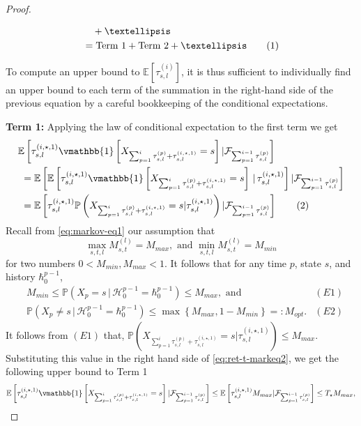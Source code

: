 \documentclass[opre,sglanonrev]{informs4}
\numberwithin{equation}{section}
\newcommand{\pow}[1]{^{(#1)}}
\newcommand{\lp}{\left(}
\newcommand{\rp}{\right)}
\newcommand{\lc}{\left\{}
\newcommand{\rc}{\right\}}
\newcommand{\lb}{\left[}
\newcommand{\rb}{\right]}
\newcommand{\History}{\mathcal{H}}
\newcommand{\history}{\hbar}
\newcommand{\Pbb}{\mathbb{P}}
\newcommand{\Fcal}{\mathcal{F}}
\newcommand\numberthis{\addtocounter{equation}{1}\tag{\theequation}}
\newcommand{\prob}{\Pbb}
\newcommand{\expec}{\mathbb{E}}
\newcommand{\indicator}{\vmathbb{1}}
\newcommand{\gn}{\, | \,}
\begin{document}
\begin{APPENDICES}
\begin{proof}
\begin{small}
\begin{align*}
    & \quad + \dots\\
    & = \text{Term 1}+\text{Term 2}+\dots\numberthis\label{eq:ret-t-markeq4}
\end{align*}
\end{small}
To compute an upper bound to $\expec[\tau_{s,l}\pow{i}]$, it is thus sufficient to individually find an upper bound to each term of the summation in the right-hand side of the previous equation by a careful bookkeeping of the conditional expectations.

\noindent\textbf{Term 1: }Applying the law of conditional expectation to the first term we get
\begin{align*}
    & \expec\lb\tau_{s,l}\pow{i,\star,1}\indicator\lb X_{\sum_{p=1}^i \tau_{s,l}\pow{p}+ \tau_{s,l}\pow{i,\star,1}}=s\rb|\Fcal_{\sum_{p=1}^{i-1} \tau_{s,l}\pow{p}}\rb \\
    &\  =  \expec\lb \expec\lb\tau_{s,l}\pow{i,\star,1}\indicator\lb X_{\sum_{p=1}^i \tau_{s,l}\pow{p}+ \tau_{s,l}\pow{i,\star,1}}=s\rb\gn\tau_{s,l}\pow{i,\star,1} \rb|\Fcal_{\sum_{p=1}^{i-1} \tau_{s,l}\pow{p}} \rb\\
    &\ = \expec\lb\tau_{s,l}\pow{i,\star,1}\prob\lp X_{\sum_{p=1}^i \tau_{s,l}\pow{p}+ \tau_{s,l}\pow{i,\star,1}}=s| \tau_{s,l}\pow{i,\star,1} \rp|\Fcal_{\sum_{p=1}^{i-1} \tau_{s,l}\pow{p}}\rb \numberthis\label{eq:ret-t-markeq2}
\end{align*}
Recall from \cref{eq:markov-eq1} our assumption that 
\[
 \max_{s,t,l} M_{s,t}^{(l)}=M_{max}, \text{ and } \min_{s,t,l} M_{s,t}^{(l)}=M_{min}
\]
for two numbers $0<M_{min},M_{max}<1$. It follows that for any time $p$, state $s$, and history $\history_0^{p-1}$,
\begin{align*}
    &M_{min}\leq \prob\lp X_p=s\gn \History_0^{p-1}=\history_0^{p-1}\rp\leq M_{max}, \, \, \text{and } & (E1)\\
    & \prob\lp X_p\neq s\gn \History_0^{p-1}=\history_0^{p-1}\rp\leq \max\lc  M_{max},1-M_{min}\rc=:M_{opt}. & (E2)
\end{align*}
It follows from $(E1)$ that, $\prob\lp X_{\sum_{p=1}^i \tau_{s,l}\pow{p}+ \tau_{s,l}\pow{i,\star,1}}=s| \tau_{s,l}\pow{i,\star,1} \rp\leq M_{max}$. Substituting this value in the right hand side of \cref{eq:ret-t-markeq2}, we get the following upper bound to Term 1
\[
 \expec\lb\tau_{s,l}\pow{i,\star,1}\indicator\lb X_{\sum_{p=1}^i \tau_{s,l}\pow{p}+ \tau_{s,l}\pow{i,\star,1}}=s\rb|\Fcal_{\sum_{p=1}^{i-1} \tau_{s,l}\pow{p}}\rb\leq \expec\lb \tau_{s,l}\pow{i,\star,1}M_{max}|\Fcal_{\sum_{p=1}^{i-1} \tau_{s,l}\pow{p}}\rb\leq T_\star M_{max},
\]
\end{proof}
\end{APPENDICES}
\end{document}
